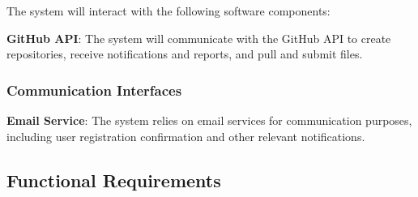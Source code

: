 \documentclass{article}
\begin{document}
The system will interact with the following software components:

\textbf{GitHub API}: The system will communicate with the GitHub API to create repositories, receive notifications and reports, and pull and submit files.

\subsubsection{Communication Interfaces}

\textbf{Email Service}: The system relies on email services for communication purposes, including user registration confirmation and other relevant notifications.

\subsection{Functional Requirements}
\end{document}

